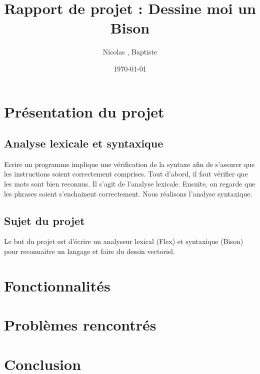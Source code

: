 \documentclass[a4paper, 12pt]{report}
\title{Rapport de projet : Dessine moi un Bison}
\author{Nicolas \bsc{Endredi}, Baptiste \bsc{Oruezabal}}
\date{\today}
\begin{document}
\maketitle


\setcounter{tocdepth}{3}
\tableofcontents

\newpage
\section{Présentation du projet}
\subsection{Analyse lexicale et syntaxique}
Ecrire un programme implique une vérification de la syntaxe afin de s'assurer que les instructions soient correctement comprises. Tout d'abord, il faut vérifier que les mots sont bien reconnus. Il s'agit de l'analyse lexicale. Ensuite, on regarde que les phrases soient s'enchainent correctement. Nous réalisons l'analyse syntaxique. \\

\subsection{Sujet du projet}
Le but du projet est d'écrire un analyseur lexical (Flex) et syntaxique (Bison) pour reconnaitre un langage et faire du dessin vectoriel.

\newpage
\section{Fonctionnalités}

\newpage
\section{Problèmes rencontrés}

\section{Conclusion}
\end{document}
